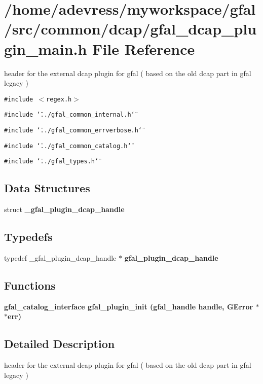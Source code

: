 \section{/home/adevress/myworkspace/gfal/src/common/dcap/gfal\_\-dcap\_\-plugin\_\-main.h File Reference}
\label{gfal__dcap__plugin__main_8h}
header for the external dcap plugin for gfal ( based on the old dcap part in gfal legacy ) 

{\tt \#include $<$regex.h$>$}\par
{\tt \#include \char`\"{}../gfal\_\-common\_\-internal.h\char`\"{}}\par
{\tt \#include \char`\"{}../gfal\_\-common\_\-errverbose.h\char`\"{}}\par
{\tt \#include \char`\"{}../gfal\_\-common\_\-catalog.h\char`\"{}}\par
{\tt \#include \char`\"{}../gfal\_\-types.h\char`\"{}}\par
\subsection*{Data Structures}
\begin{CompactItemize}
\item 
struct \textbf{\_\-gfal\_\-plugin\_\-dcap\_\-handle}
\end{CompactItemize}
\subsection*{Typedefs}
\begin{CompactItemize}
\item 
typedef \_\-gfal\_\-plugin\_\-dcap\_\-handle $\ast$ \textbf{gfal\_\-plugin\_\-dcap\_\-handle}\label{gfal__dcap__plugin__main_8h_74f42d292270fc09b8cf73c32ce80045}

\end{CompactItemize}
\subsection*{Functions}
\begin{CompactItemize}
\item 
\bf{gfal\_\-catalog\_\-interface} \bf{gfal\_\-plugin\_\-init} (gfal\_\-handle handle, GError $\ast$$\ast$err)
\end{CompactItemize}


\subsection{Detailed Description}
header for the external dcap plugin for gfal ( based on the old dcap part in gfal legacy ) 


